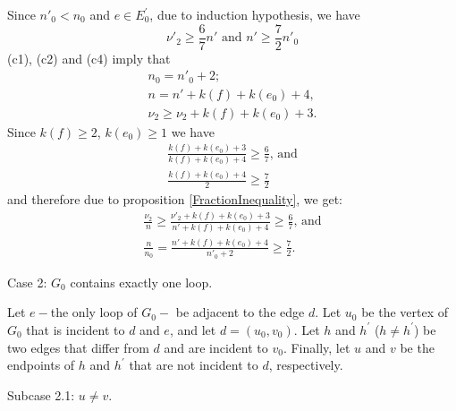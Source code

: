 \documentclass[fleqn,12pt,twoside]{article}
\newenvironment{proof}[1][Proof.]{\begin{trivlist}
\item[\hskip \labelsep {\bfseries #1}]}{\end{trivlist}}
\begin{document}
\begin{proof}
Since $n'_0 <n_0$ and $e\in E_{0}^{\prime }$, due to induction
hypothesis, we have
\begin{equation*}
\nu' _{2}\geq \frac{6}{7}n' \text{ and }n' \geq \frac{7}{2}n'_0
\end{equation*}(c1), (c2) and (c4) imply that\begin{gather*}
n_0 =n'_0+2;
\\
n=n'+k(f)+k(e_{0})+4, \\
\nu _{2}\geq \nu _{2}+k(f)+k(e_{0})+3.
\end{gather*}Since $k(f)\geq 2$, $k(e_{0})\geq 1$ we have
\begin{gather*}
\frac{k(f)+k(e_{0})+3}{k(f)+k(e_{0})+4}\geq \frac{6}{7}\text{, and} \\
\frac{k(f)+k(e_{0})+4}{2}\geq \frac{7}{2}
\end{gather*}and therefore due to proposition \ref{FractionInequality}, we get:
\begin{gather*}
\frac{\nu _{2}}{n }\geq \frac{\nu' _{2}+k(f)+k(e_{0})+3}{n'+k(f)+k(e_{0})+4}\geq \frac{6}{7}\text{, and} \\
\frac{n}{n_0}=\frac{n'+k(f)+k(e_{0})+4}{n'_0+2}\geq \frac{7}{2}.
\end{gather*}

Case 2: $G_{0}$ contains exactly one loop.

Let $e-$the only loop of $G_{0}-$ be adjacent to the edge $d$. Let
$u_{0}$ be the vertex of $G_{0}$ that is incident to $d$ and $e$, and let $d=(u_{0},v_{0})$. Let $h$ and $h^{\prime }$ ($h\neq h^{\prime }$) be
two edges that differ from $d$ and are incident to $v_{0}$. Finally,
let $u$ and $v$ be the endpoints of $h$ and $h^{\prime }$ that are
not incident to $d$, respectively.

Subcase 2.1: $u\neq v$.


\end{proof}
\end{document}
